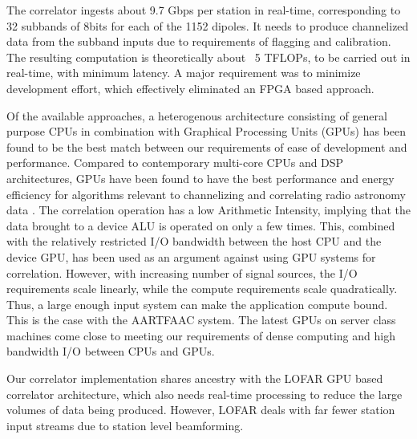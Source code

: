 \documentclass{ws-jai}
\begin{document}
The correlator ingests about 9.7 Gbps per station in real-time, corresponding to
32  subbands of  8bits for  each  of the  1152  dipoles.  It  needs to  produce
channelized data  from the subband  inputs due  to requirements of  flagging and
calibration. The resulting  computation is theoretically about  ~5 TFLOPs, to be
carried out  in real-time,  with minimum  latency.  A  major requirement  was to
minimize  development  effort,  which   effectively  eliminated  an  FPGA  based
approach.

Of the available  approaches, a heterogenous architecture  consisting of general
purpose  CPUs in  combination with  Graphical Processing  Units (GPUs)  has been
found to be the  best match between our requirements of  ease of development and
performance.  Compared  to contemporary  multi-core CPUs and  DSP architectures,
GPUs have  been found  to have  the best performance  and energy  efficiency for
algorithms  relevant  to  channelizing  and  correlating  radio  astronomy  data
\cite{romein2016comparison}.   The correlation  operation has  a low  Arithmetic
Intensity, implying that the data brought to  a device ALU is operated on only a
few times.  This, combined with  the relatively restricted I/O bandwidth between
the host CPU and the device GPU, has  been used as an argument against using GPU
systems for correlation.  However, with increasing number of signal sources, the
I/O  requirements   scale  linearly,   while  the  compute   requirements  scale
quadratically.   Thus, a  large enough  input  system can  make the  application
compute bound. This  is the case with  the AARTFAAC system.  The  latest GPUs on
server class machines come close to  meeting our requirements of dense computing
and high bandwidth I/O between CPUs and GPUs.

Our  correlator  implementation  shares  ancestry   with  the  LOFAR  GPU  based
correlator architecture,  which also  needs real-time  processing to  reduce the
large  volumes of  data being  produced.  However,  LOFAR deals  with far  fewer
station input streams due to station level beamforming.


\end{document}
